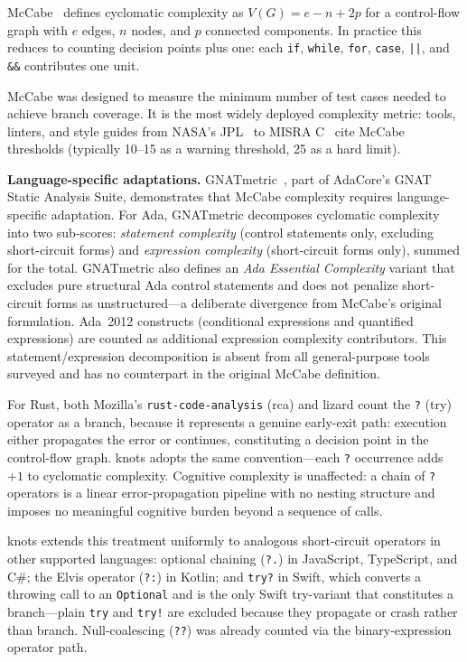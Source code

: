 \documentclass[10pt,twocolumn,letterpaper]{article}
\begin{document}
McCabe~\cite{mccabe} defines cyclomatic complexity as $V(G) = e - n + 2p$
for a control-flow graph with $e$ edges, $n$ nodes, and $p$ connected
components.  In practice this reduces to counting decision points plus
one: each \texttt{if}, \texttt{while}, \texttt{for}, \texttt{case},
\texttt{||}, and \texttt{\&\&} contributes one unit.

McCabe was designed to measure the minimum number of test cases needed to
achieve branch coverage.  It is the most widely deployed complexity metric:
tools, linters, and style guides from NASA's JPL~\cite{jpl} to MISRA
C~\cite{misra} cite McCabe thresholds (typically 10--15 as a warning
threshold, 25 as a hard limit).

\textbf{Language-specific adaptations.}
GNATmetric~\cite{gnatmetric}, part of AdaCore's GNAT Static Analysis
Suite, demonstrates that McCabe complexity requires language-specific
adaptation.  For Ada, GNATmetric decomposes cyclomatic complexity into
two sub-scores: \emph{statement complexity} (control statements only,
excluding short-circuit forms) and \emph{expression complexity}
(short-circuit forms only), summed for the total.  GNATmetric also
defines an \emph{Ada Essential Complexity} variant that excludes pure
structural Ada control statements and does not penalize short-circuit
forms as unstructured---a deliberate divergence from McCabe's original
formulation.  Ada~2012 constructs (conditional expressions and quantified
expressions) are counted as additional expression complexity contributors.
This statement/expression decomposition is absent from all general-purpose
tools surveyed and has no counterpart in the original McCabe definition.

For Rust, both Mozilla's \texttt{rust-code-analysis} (rca) and lizard
count the \texttt{?} (try) operator as a branch, because it represents a
genuine early-exit path: execution either propagates the error or
continues, constituting a decision point in the control-flow graph.
knots adopts the same convention---each \texttt{?} occurrence adds $+1$
to cyclomatic complexity.  Cognitive complexity is unaffected: a chain of
\texttt{?} operators is a linear error-propagation pipeline with no
nesting structure and imposes no meaningful cognitive burden beyond a
sequence of calls.

knots extends this treatment uniformly to analogous short-circuit operators
in other supported languages: optional chaining (\texttt{?.}) in
JavaScript, TypeScript, and C\#; the Elvis operator (\texttt{?:}) in
Kotlin; and \texttt{try?} in Swift, which converts a throwing call to an
\texttt{Optional} and is the only Swift try-variant that constitutes a
branch---plain \texttt{try} and \texttt{try!} are excluded because they
propagate or crash rather than branch.  Null-coalescing (\texttt{??}) was
already counted via the binary-expression operator path.
\end{document}
